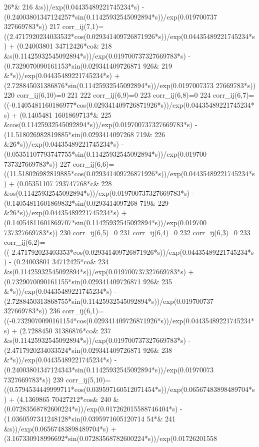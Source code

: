 \begin{DoxyCode}
      26*&
216          &s))/exp(0.04435489221745234*s) - (0.24003801347124257*sin(0.11425932545092894*s))/exp(0.019700737
      327669783*s)) 
217     corr\_ij(7,1)=((2.4717920234033532*cos(0.029341409726871926*s))/exp(0.04435489221745234*s) + (0.24003801
      34712426*co&
218          &s(0.11425932545092894*s))/exp(0.019700737327669783*s) - (0.7329070090161153*sin(0.029341409726871
      926&
219          &*s))/exp(0.04435489221745234*s) + (2.728845031386876*sin(0.11425932545092894*s))/exp(0.0197007373
      27669783*s)) 
220     corr\_ij(6,10)=0
221 
222     corr\_ij(6,9)=0
223     corr\_ij(6,8)=0
224     corr\_ij(6,7)=((-0.1405481160186977*cos(0.029341409726871926*s))/exp(0.04435489221745234*s) + (0.1405481
      1601869713*&
225          &cos(0.11425932545092894*s))/exp(0.019700737327669783*s) - (11.518026982819885*sin(0.0293414097268
      719&
226          &26*s))/exp(0.04435489221745234*s) - (0.05351107793747755*sin(0.11425932545092894*s))/exp(0.019700
      737327669783*s)) 
227     corr\_ij(6,6)=((11.518026982819885*cos(0.029341409726871926*s))/exp(0.04435489221745234*s) + (0.05351107
      793747768*c&
228          &os(0.11425932545092894*s))/exp(0.019700737327669783*s) - (0.14054811601869832*sin(0.0293414097268
      719&
229          &26*s))/exp(0.04435489221745234*s) + (0.14054811601869707*sin(0.11425932545092894*s))/exp(0.019700
      737327669783*s)) 
230     corr\_ij(6,5)=0
231     corr\_ij(6,4)=0
232     corr\_ij(6,3)=0
233     corr\_ij(6,2)=((-2.471792023403353*cos(0.029341409726871926*s))/exp(0.04435489221745234*s) - (0.24003801
      34712425*co&
234          &s(0.11425932545092894*s))/exp(0.019700737327669783*s) + (0.7329070090161155*sin(0.029341409726871
      926&
235          &*s))/exp(0.04435489221745234*s) - (2.7288450313868755*sin(0.11425932545092894*s))/exp(0.019700737
      327669783*s)) 
236     corr\_ij(6,1)=((-0.7329070090161154*cos(0.029341409726871926*s))/exp(0.04435489221745234*s) + (2.7288450
      31386876*co&
237          &s(0.11425932545092894*s))/exp(0.019700737327669783*s) - (2.4717920234033524*sin(0.029341409726871
      926&
238          &*s))/exp(0.04435489221745234*s) - (0.24003801347124343*sin(0.11425932545092894*s))/exp(0.01970073
      7327669783*s)) 
239     corr\_ij(5,10)=((0.5794534449999711*cos(0.039597160512071454*s))/exp(0.06567483898489704*s) + (4.1369865
      70427212*cos&
240          &(0.07283568782600224*s))/exp(0.017262015588746404*s) - (1.0360597341248128*sin(0.0395971605120714
      54*&
241          &s))/exp(0.06567483898489704*s) + (3.167330918996692*sin(0.07283568782600224*s))/exp(0.01726201558

\end{DoxyCode}
